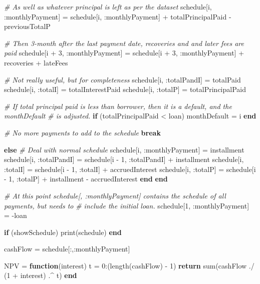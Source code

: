 \documentclass[11pt,]{report}
\newenvironment{Shaded}{\begin{snugshade}}{\end{snugshade}}
\newcommand{\CommentTok}[1]{\textcolor[rgb]{0.56,0.35,0.01}{\textit{#1}}}
\newcommand{\FloatTok}[1]{\textcolor[rgb]{0.00,0.00,0.81}{#1}}
\newcommand{\KeywordTok}[1]{\textcolor[rgb]{0.13,0.29,0.53}{\textbf{#1}}}
\newcommand{\NormalTok}[1]{#1}
\begin{document}
\begin{Shaded}
\begin{Highlighting}[numbers=left,,]
      \CommentTok{# As well as whatever principal is left as per the dataset}
\NormalTok{      schedule[i, :monthlyPayment] = schedule[i, :monthlyPayment] + totalPrincipalPaid - previousTotalP}

      \CommentTok{# Then 3-month after the last payment date, recoveries and and later fees are paid}
\NormalTok{      schedule[i + }\FloatTok{3}\NormalTok{, :monthlyPayment] = schedule[i + }\FloatTok{3}\NormalTok{, :monthlyPayment] + recoveries + lateFees}

      \CommentTok{# Not really useful, but for completeness}
\NormalTok{      schedule[i, :totalPandI] = totalPaid}
\NormalTok{      schedule[i, :totalI]     = totalInterestPaid}
\NormalTok{      schedule[i, :totalP]     = totalPrincipalPaid}

      \CommentTok{# If total principal paid is less than borrower, then it is a default, and the monthDefault}
      \CommentTok{# is adjusted.}
      \KeywordTok{if}\NormalTok{ (totalPrincipalPaid < loan)}
\NormalTok{        monthDefault = i}
      \KeywordTok{end}

      \CommentTok{# No more payments to add to the schedule}
      \KeywordTok{break}

    \KeywordTok{else}
      \CommentTok{# Deal with normal schedule}
\NormalTok{      schedule[i, :monthlyPayment] = installment}
\NormalTok{      schedule[i, :totalPandI]     = schedule[i - }\FloatTok{1}\NormalTok{, :totalPandI] + installment}
\NormalTok{      schedule[i, :totalI]         = schedule[i - }\FloatTok{1}\NormalTok{, :totalI]     + accruedInterest}
\NormalTok{      schedule[i, :totalP]         = schedule[i - }\FloatTok{1}\NormalTok{, :totalP]     + installment - accruedInterest}
    \KeywordTok{end}
  \KeywordTok{end}

  \CommentTok{# At this point schedule[, :monthlyPayment] contains the schedule of all payments, but needs to}
  \CommentTok{# include the initial loan.}
\NormalTok{  schedule[}\FloatTok{1}\NormalTok{, :monthlyPayment] = -loan}

  \KeywordTok{if}\NormalTok{ (showSchedule)}
\NormalTok{    print(schedule)}
  \KeywordTok{end}

\NormalTok{  cashFlow = schedule[:,:monthlyPayment]}

\NormalTok{  NPV = }\KeywordTok{function}\NormalTok{(interest)}
\NormalTok{    t = }\FloatTok{0}\NormalTok{:(length(cashFlow) - }\FloatTok{1}\NormalTok{)}
    \KeywordTok{return}\NormalTok{ sum(cashFlow ./ (}\FloatTok{1}\NormalTok{ + interest) .^ t)}
  \KeywordTok{end}


\end{Highlighting}
\end{Shaded}
\end{document}
